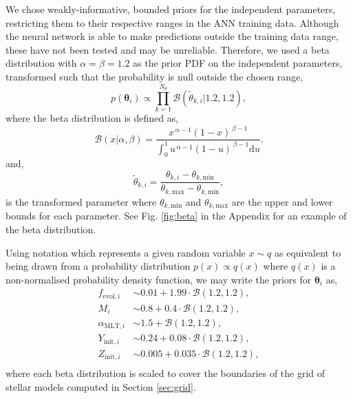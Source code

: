 We chose weakly-informative, bounded priors for the independent parameters, restricting them to their respective ranges in the ANN training data. Although the neural network is able to make predictions outside the training data range, these have not been tested and may be unreliable. Therefore, we used a beta distribution with $\alpha = \beta = 1.2$ as the prior PDF on the independent parameters, transformed such that the probability is null outside the chosen range,
%
\begin{equation}
    p(\boldsymbol{\theta}_i) \propto \prod_{k=1}^{N_{\theta}} \mathcal{B}\left(\tilde{\theta}_{k, i} | 1.2, 1.2\right),
\end{equation}
%
where the beta distribution is defined as,
%
\begin{equation}
    \mathcal{B}(x | \alpha, \beta) = \frac{x^{\,\alpha-1}(1-x)^{\,\beta-1}}{\int_{0}^{1} u^{\,\alpha-1}(1-u)^{\,\beta-1} \mathrm{d} u}.
    \label{eq:beta}
\end{equation}
%
and,
\begin{equation}
    \tilde{\theta}_{k, i} = \frac{\theta_{k, i} - \theta_{k, \mathrm{min}}}{\theta_{k, \mathrm{max}} - \theta_{k, \mathrm{min}}},
\end{equation}
is the transformed parameter where $\theta_{k, \mathrm{min}}$ and $\theta_{k, \mathrm{max}}$ are the upper and lower bounds for each parameter. See Fig. \ref{fig:beta} in the Appendix for an example of the beta distribution.

Using notation which represents a given random variable $x \sim q$ as equivalent to being drawn from a probability distribution $p(x) \propto q(x)$ where $q(x)$ is a non-normalised probability density function, we may write the priors for $\boldsymbol{\theta}_i$ as,
%
\begin{align*}
    f_{\mathrm{evol}, i} &\sim 0.01 + 1.99 \cdot \mathcal{B}(1.2, 1.2),\\
    M_i &\sim 0.8 + 0.4 \cdot \mathcal{B}(1.2, 1.2),\\
    \alpha_{\mathrm{MLT}, i} &\sim 1.5 + \mathcal{B}(1.2, 1.2),\\
    Y_{\mathrm{init}, i} &\sim 0.24 + 0.08 \cdot \mathcal{B}(1.2, 1.2),\\
    Z_{\mathrm{init}, i} &\sim 0.005 + 0.035 \cdot \mathcal{B}(1.2, 1.2),\\
\end{align*}
%
where each beta distribution is scaled to cover the boundaries of the grid of stellar models computed in Section \ref{sec:grid}.

